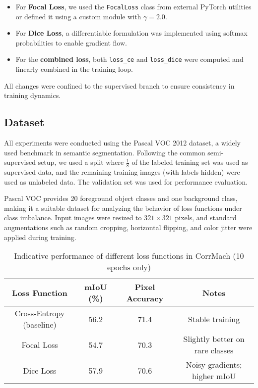 \documentclass[10pt,twocolumn,letterpaper]{article}
\begin{document}
\begin{itemize}
  \item For \textbf{Focal Loss}, we used the \texttt{FocalLoss} class from external PyTorch utilities or defined it using a custom module with \(\gamma = 2.0\).
  \item For \textbf{Dice Loss}, a differentiable formulation was implemented using softmax probabilities to enable gradient flow.
  \item For the \textbf{combined loss}, both \texttt{loss\_ce} and \texttt{loss\_dice} were computed and linearly combined in the training loop.
\end{itemize}

All changes were confined to the supervised branch to ensure consistency in training dynamics.

\subsection{Dataset}
All experiments were conducted using the Pascal VOC 2012 dataset, a widely used benchmark in semantic segmentation. Following the common semi-supervised setup, we used a split where \(\frac{1}{8}\) of the labeled training set was used as supervised data, and the remaining training images (with labels hidden) were used as unlabeled data. The validation set was used for performance evaluation.

Pascal VOC provides 20 foreground object classes and one background class, making it a suitable dataset for analyzing the behavior of loss functions under class imbalance. Input images were resized to \( 321 \times 321 \) pixels, and standard augmentations such as random cropping, horizontal flipping, and color jitter were applied during training.


\begin{table*}[h]
    \centering
\caption{Indicative performance of different loss functions in CorrMach (10 epochs only)}
\label{tab:loss_results}
    \begin{tabular}{|c|c|c|c|}
        \hline
        Loss Function& mIoU (\%)& Pixel Accuracy& Notes\\ \hline
        Cross-Entropy (baseline)& 56.2& 71.4& Stable training\\ \hline
        Focal Loss& 54.7& 70.3& Slightly better on rare classes\\ \hline
        Dice Loss& 57.9& 70.6& Noisy gradients; higher mIoU\\ \hline
    \end{tabular}
\end{table*}
\end{document}
